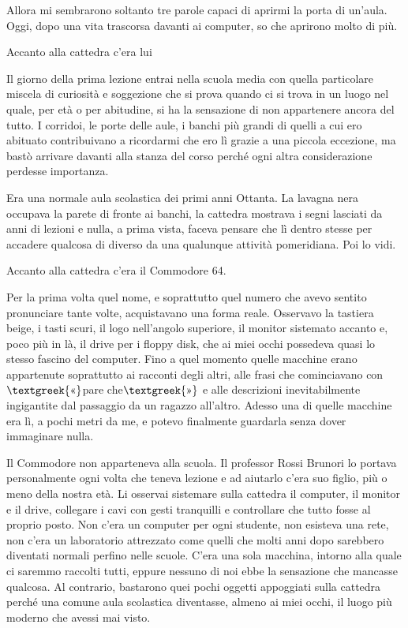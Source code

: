 \documentclass{article}
\begin{document}
Allora mi sembrarono soltanto tre parole capaci di aprirmi la porta di un'aula. Oggi, dopo una vita trascorsa davanti ai
computer, so che aprirono molto di più.

Accanto alla cattedra c'era lui

Il giorno della prima lezione entrai nella scuola media con quella particolare miscela di curiosità e soggezione che si
prova quando ci si trova in un luogo nel quale, per età o per abitudine, si ha la sensazione di non appartenere ancora
del tutto. I corridoi, le porte delle aule, i banchi più grandi di quelli a cui ero abituato contribuivano a ricordarmi
che ero lì grazie a una piccola eccezione, ma bastò arrivare davanti alla stanza del corso perché ogni altra
considerazione perdesse importanza.

Era una normale aula scolastica dei primi anni Ottanta. La lavagna nera occupava la parete di fronte ai banchi, la
cattedra mostrava i segni lasciati da anni di lezioni e nulla, a prima vista, faceva pensare che lì dentro stesse per
accadere qualcosa di diverso da una qualunque attività pomeridiana. Poi lo vidi.

Accanto alla cattedra c'era il Commodore 64.

Per la prima volta quel nome, e soprattutto quel numero che avevo sentito pronunciare tante volte, acquistavano una
forma reale. Osservavo la tastiera beige, i tasti scuri, il logo nell'angolo superiore, il monitor sistemato accanto e,
poco più in là, il drive per i floppy disk, che ai miei occhi possedeva quasi lo stesso fascino del computer. Fino a
quel momento quelle macchine erano appartenute soprattutto ai racconti degli altri, alle frasi che cominciavano con
$\text{\textgreek{«}}$pare che$\text{\textgreek{»}}$ e alle descrizioni inevitabilmente ingigantite dal passaggio da un
ragazzo all'altro. Adesso una di quelle macchine era lì, a pochi metri da me, e potevo finalmente guardarla senza dover
immaginare nulla.

Il Commodore non apparteneva alla scuola. Il professor Rossi Brunori lo portava personalmente ogni volta che teneva
lezione e ad aiutarlo c'era suo figlio, più o meno della nostra età. Li osservai sistemare sulla cattedra il computer,
il monitor e il drive, collegare i cavi con gesti tranquilli e controllare che tutto fosse al proprio posto. Non c'era
un computer per ogni studente, non esisteva una rete, non c'era un laboratorio attrezzato come quelli che molti anni
dopo sarebbero diventati normali perfino nelle scuole. C'era una sola macchina, intorno alla quale ci saremmo raccolti
tutti, eppure nessuno di noi ebbe la sensazione che mancasse qualcosa. Al contrario, bastarono quei pochi oggetti
appoggiati sulla cattedra perché una comune aula scolastica diventasse, almeno ai miei occhi, il luogo più moderno che
avessi mai visto.
\end{document}
